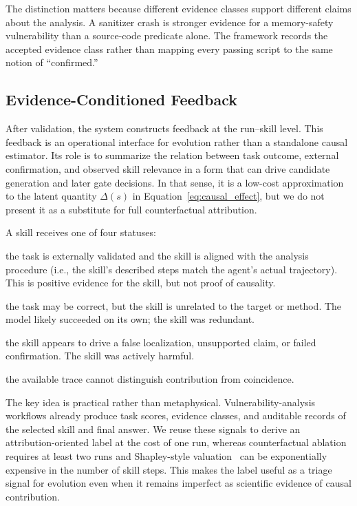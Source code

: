 ﻿\documentclass[preprint,12pt]{elsarticle}
\begin{document}
The distinction matters because different evidence classes support
different claims about the analysis.  A sanitizer crash is stronger
evidence for a memory-safety vulnerability than a source-code predicate
alone.  The framework records the accepted evidence class rather than
mapping every passing script to the same notion of ``confirmed.''

\subsection{Evidence-Conditioned Feedback}
\label{sec:feedback}

After validation, the system constructs feedback at the run--skill level.
This feedback is an operational interface for evolution rather than a
standalone causal estimator.  Its role is to summarize the relation between
task outcome, external confirmation, and observed skill relevance in a form
that can drive candidate generation and later gate decisions.  In that
sense, it is a low-cost approximation to the latent quantity $\Delta(s)$ in
Equation~\ref{eq:causal_effect}, but we do not present it as a substitute
for full counterfactual attribution.

A skill receives one of four statuses:

\begin{description}[style=nextline,leftmargin=2.4cm]
    \item[Supported ($\hat{\Delta} > 0$):] the task is externally validated
    and the skill is aligned with the analysis procedure (i.e., the skill's
    described steps match the agent's actual trajectory).  This is
    positive evidence for the skill, but not proof of causality.
    \item[Mismatched ($\hat{\Delta} \approx 0$):] the task may be correct,
    but the skill is unrelated to the target or method.  The model likely
    succeeded on its own; the skill was redundant.
    \item[Contradicted ($\hat{\Delta} < 0$):] the skill appears to drive a
    false localization, unsupported claim, or failed confirmation.  The
    skill was actively harmful.
    \item[Unknown:] the available trace cannot distinguish contribution
    from coincidence.
\end{description}

The key idea is practical rather than metaphysical.  Vulnerability-analysis
workflows already produce task scores, evidence classes, and auditable
records of the selected skill and final answer.  We reuse these signals to
derive an attribution-oriented label at the cost of one run, whereas
counterfactual ablation requires at least two runs and Shapley-style
valuation~\cite{skillshapley} can be exponentially expensive in the number
of skill steps.  This makes the label useful as a triage signal for
evolution even when it remains imperfect as scientific evidence of causal
contribution.
\end{document}
